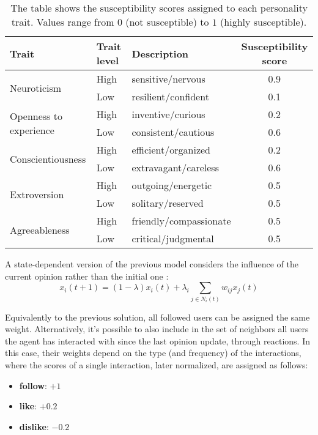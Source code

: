 \begin{table}[h]
\centering
\begin{tabular}{|l|l|l|c|}
\hline
\textbf{Trait} & \textbf{Trait level} & \textbf{Description} & \textbf{Susceptibility score} \\
\hline
\multirow{2}{*}{Neuroticism}       
  & High & sensitive/nervous         & 0.9 \\
  & Low & resilient/confident        & 0.1 \\
\hline
\multirow{2}{*}{Openness to experience}          
  & High & inventive/curious         & 0.2 \\
  & Low & consistent/cautious        & 0.6 \\
\hline
\multirow{2}{*}{Conscientiousness} 
  & High & efficient/organized       & 0.2 \\
  & Low & extravagant/careless       & 0.6 \\
\hline
\multirow{2}{*}{Extroversion}      
  & High & outgoing/energetic        & 0.5 \\
  & Low & solitary/reserved          & 0.5 \\
\hline
\multirow{2}{*}{Agreeableness}     
  & High & friendly/compassionate    & 0.5 \\
  & Low & critical/judgmental        & 0.5 \\
\hline
\end{tabular}
\caption{The table shows the susceptibility scores assigned to each personality trait. Values range from $0$ (not susceptible) to $1$ (highly susceptible).}
\label{tab:susceptibility}
\end{table}

\medskip
A state-dependent version of the previous model considers the influence of the current opinion rather than the initial one \cite{Ye2018Opinion}:
\[
x_i(t + 1) = (1 - \lambda) x_i(t) + \lambda_i  \sum_{j \in N_i(t)} w_{ij} x_j (t)
\]

Equivalently to the previous solution, all followed users can be assigned the same weight.
Alternatively, it's possible to also include in the set of neighbors all users the agent has interacted with since the last opinion update, through reactions. In this case, their weights depend on the type (and frequency) of the interactions, where the scores of a single interaction, later normalized, are assigned as follows: 
\begin{itemize}
    \item \textbf{follow}: $+1$
    \item \textbf{like}: $+0.2$
    \item \textbf{dislike}: $-0.2$
\end{itemize}



